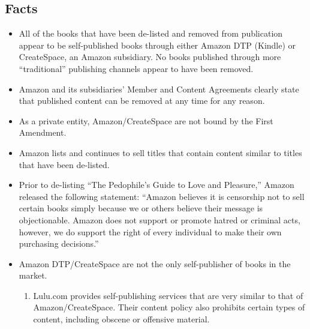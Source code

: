 \documentclass[11pt]{article}
\begin{document}
\newpage

\begin{multicols}{2}
\setcounter{page}{1}
\section{Facts}

\begin{itemize}

\item All of the books that have been de-listed and removed from publication appear to be self-published books through either Amazon DTP (Kindle) or CreateSpace, an Amazon subsidiary.  No books published through more ``traditional'' publishing channels appear to have been removed.  

\item Amazon and its subsidiaries' Member and Content Agreements clearly state that published content can be removed at any time for any reason. \cite{CreateSpaceMemberAgreement,CreateSpaceContentGuidelines,AmazonKDPContentGuidelines}

\item As a private entity, Amazon/CreateSpace are not bound by the First Amendment.

\item Amazon lists and continues to sell titles that contain content similar to titles that have been de-listed. \cite{AmazonLolitaDTPListing}

\item Prior to de-listing ``The Pedophile's Guide to Love and Pleasure,'' Amazon released the following statement: ``Amazon believes it is censorship not to sell certain books simply because we or others believe their message is objectionable.  Amazon does not support or promote hatred or criminal acts, however, we do support the right of every individual to make their own purchasing decisions.'' \cite{TechCrunchAmazonCensorship}

\item Amazon DTP/CreateSpace are not the only self-publisher of books in the market.
   \begin{enumerate}
   
   \item Lulu.com provides self-publishing services that are very similar to that of Amazon/CreateSpace.  Their content policy also prohibits certain types of content, including obscene or offensive material. \cite{LuluMemberAgreement}


\end{enumerate}
\end{itemize}
\end{multicols}
\end{document}
